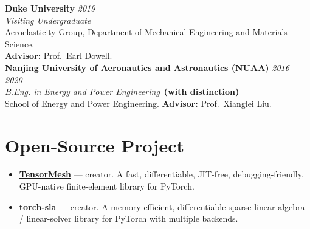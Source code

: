 \documentclass[10.5pt,a4paper]{article}
\begin{document}
\textbf{Duke University} \hfill {\color{muted}\textit{2019}}\\
\textit{Visiting Undergraduate}\\
{\color{muted}Aeroelasticity Group, Department of Mechanical Engineering and Materials Science.\\
\textbf{Advisor:} Prof.\ Earl Dowell.}\\[0.6em]

\textbf{Nanjing University of Aeronautics and Astronautics (NUAA)} \hfill {\color{muted}\textit{2016 -- 2020}}\\
\textit{B.Eng. in Energy and Power Engineering}~\textbf{(with distinction)}\\
{\color{muted}School of Energy and Power Engineering. \textbf{Advisor:} Prof.\ Xianglei Liu.}

\section{Open-Source Project}
\begin{itemize}
\item \textbf{\href{https://www.tensor-mesh.com/}{TensorMesh}} --- creator. A fast, differentiable,
JIT-free, debugging-friendly, GPU-native finite-element library for PyTorch.
\item \textbf{\href{https://www.torchsla.com/}{torch-sla}} --- creator. A memory-efficient,
differentiable sparse linear-algebra / linear-solver library for PyTorch with multiple backends.
\end{itemize}

\end{document}
